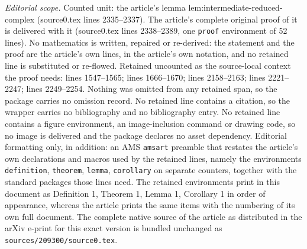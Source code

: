 \documentclass[10pt,a4paper]{amsart}
\begin{document}
\noindent\textit{Editorial scope.} Counted unit: the article's lemma lem:intermediate-reduced-complex (source0.tex lines 2335--2337). The article's complete original proof of it is delivered with it (source0.tex lines 2338--2389, one \texttt{proof} environment of 52 lines). No mathematics is written, repaired or re-derived: the statement and the proof are the article's own lines, in the article's own notation, and no retained line is substituted or re-flowed.  Retained uncounted as the source-local context the proof needs: lines 1547--1565; lines 1666--1670; lines 2158--2163; lines 2221--2247; lines 2249--2254.  Nothing was omitted from any retained span, so the package carries no omission record.  No retained line contains a citation, so the wrapper carries no bibliography and no bibliography entry.  No retained line contains a figure environment, an image-inclusion command or drawing code, so no image is delivered and the package declares no asset dependency.  Editorial formatting only, in addition: an AMS \texttt{amsart} preamble that restates the article's own declarations and macros used by the retained lines, namely the environments \texttt{definition}, \texttt{theorem}, \texttt{lemma}, \texttt{corollary} on separate counters, together with the standard packages those lines need.  The retained environments print in this document as Definition 1, Theorem 1, Lemma 1, Corollary 1 in order of appearance, whereas the article prints the same items with the numbering of its own full document.  The complete native source of the article as distributed in the arXiv e-print for this exact version is bundled unchanged as \texttt{sources/209300/source0.tex}.
\end{document}
